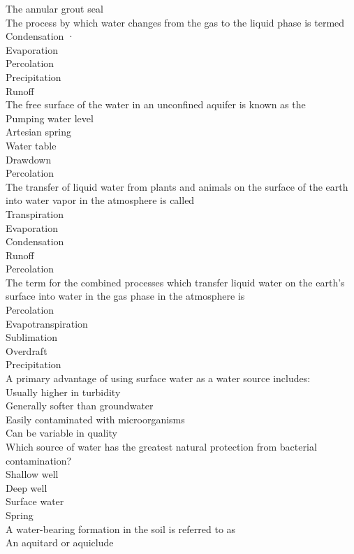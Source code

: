 The  annular grout seal	\\
The process by which water changes from the gas to the liquid phase is termed\\
Condensation	·\\
Evaporation\\
Percolation\\
Precipitation\\
Runoff\\
The free surface of the water in an unconfined aquifer is known as the\\
Pumping water level\\
Artesian spring\\
Water table\\
Drawdown\\
Percolation\\
The transfer of liquid water from plants and animals on the surface of the earth into water vapor in the atmosphere is called\\
Transpiration\\
Evaporation\\
Condensation\\
Runoff\\
Percolation\\
The term for the combined processes which transfer liquid water on the earth's surface into water in the gas phase in the atmosphere is\\
Percolation\\
Evapotranspiration\\
Sublimation\\
Overdraft\\
Precipitation\\
A primary advantage of using surface water as a water source includes:\\
Usually higher in turbidity\\
Generally softer than groundwater\\
Easily contaminated with microorganisms\\
Can be variable in quality\\
Which source of water has the greatest natural protection from bacterial contamination?\\
Shallow well\\
Deep well\\
Surface water\\
Spring\\
A water-bearing formation in the soil is referred to as\\
An aquitard or aquiclude\\
